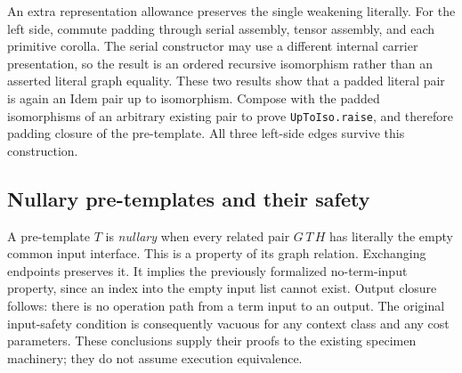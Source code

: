 \par{}


An extra representation allowance preserves the single weakening literally.
For the left side, commute padding through serial assembly, tensor assembly,
and each primitive corolla. The serial constructor may use a different
internal carrier presentation, so the result is an ordered recursive
isomorphism rather than an asserted literal graph equality. These two
results show that a padded literal pair is again an Idem pair up to
isomorphism. Compose with the padded isomorphisms of an arbitrary existing
pair to prove \texttt{UpToIso.raise}, and therefore padding closure of the
pre-template. All three left-side edges survive this construction.

\par{}



\subsection{Nullary pre-templates and their safety}
A pre-template $T$ is \emph{nullary} when every related pair $G\,T\,H$ has
literally the empty common input interface. This is a property of its graph
relation. Exchanging endpoints preserves it. It implies the previously
formalized no-term-input property, since an index into the empty input list
cannot exist. Output closure follows: there is no operation path from a term
input to an output. The original input-safety condition is consequently
vacuous for any context class and any cost parameters. These conclusions
supply their proofs to the existing specimen machinery; they do not assume
execution equivalence.
\par{}
